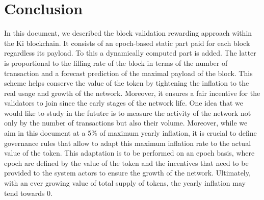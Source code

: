 \documentclass[]{article}
\begin{document}
\section{Conclusion}
In this document, we described the block validation rewarding approach within the Ki blockchain. It consists of an epoch-based static part paid for each block regardless its payload. To this a dynamically computed part is added. The latter is proportional to the filling rate of the block in terms of the number of transaction and a forecast prediction of the maximal payload of the block. This scheme helps conserve the value of the token by tightening the inflation to the real usage and growth of the network. Moreover, it ensures a fair incentive for the validators to join since the early stages of the network life. One idea that we would like to study in the fututre is to measure the activity of the network not only by the number of transactions but also their volume. Moreover, while we aim in this document at a 5\% of maximum yearly inflation, it is crucial to define governance rules that allow to adapt this maximum inflation rate to the actual value of the token. This adaptation is to be performed on an epoch basis, where epoch are defined by the value of the token and the incentives that need to be provided to the system actors to ensure the growth of the network. Ultimately, with an ever growing value of total supply of tokens, the yearly inflation may tend towards 0.

\label{sec:conclusion}
\end{document}
